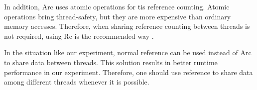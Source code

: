 In addition, Arc uses atomic operations for tis reference counting. Atomic operations bring thread-safety, but they are more expensive than ordinary memory accesses.
Therefore, when sharing reference counting between threads is not required, using Rc is the recommended way \cite{RustArcPage}.

In the situation like our experiment, normal reference can be used instead of Arc to share data between threads. 
This solution results in better runtime performance in our experiment. Therefore, one should use reference to share data among different threads 
whenever it is possible.

